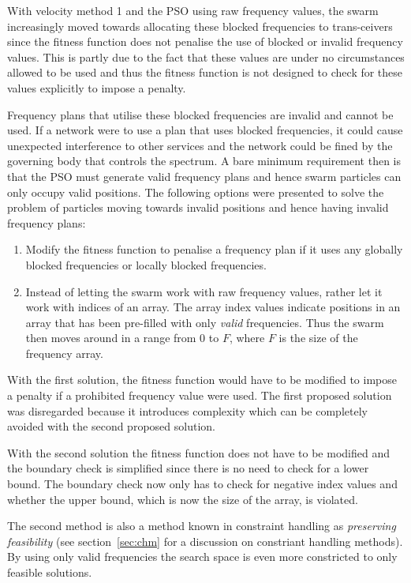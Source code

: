 With velocity method 1 and the \gls{PSO} using raw frequency values, the swarm increasingly moved towards allocating these blocked frequencies to trans-ceivers since the fitness function does not penalise the use of blocked or invalid frequency values. This is partly due to the fact that these values are under no circumstances allowed to be used and thus the fitness function is not designed to check for these values explicitly to impose a penalty.

Frequency plans that utilise these blocked frequencies are invalid and cannot be used. If a network were to use a plan that uses blocked frequencies, it could cause unexpected interference to other services and the network could be fined by the governing body that controls the spectrum. A bare minimum requirement then is that the \gls{PSO} must generate valid frequency plans and hence swarm particles can only occupy valid positions. The following options were presented to solve the problem of particles moving towards invalid positions and hence having invalid frequency plans:
\begin{enumerate}
\item Modify the fitness function to penalise a frequency plan if it uses any globally blocked frequencies or locally blocked frequencies.
\item Instead of letting the swarm work with raw frequency values, rather let it work with indices of an array. The array index values indicate positions in an array that has been pre-filled with only \emph{valid} frequencies. Thus the swarm then moves around in a range from 0 to $F$, where $F$ is the size of the frequency array.
\end{enumerate}

With the first solution, the fitness function would have to be modified to impose a penalty if a prohibited frequency value were used. The first proposed solution was disregarded because it introduces complexity which can be completely avoided with the second proposed solution.

With the second solution the fitness function does not have to be modified and the boundary check is simplified since there is no need to check for a lower bound. The boundary check now only has to check for negative index values and whether the upper bound, which is now the size of the array, is violated. 

The second method is also a method known in constraint handling as \emph{preserving feasibility} (see section~\ref{sec:chm} for a discussion on constriant handling methods). By using only valid frequencies the search space is even more constricted to only feasible solutions.


